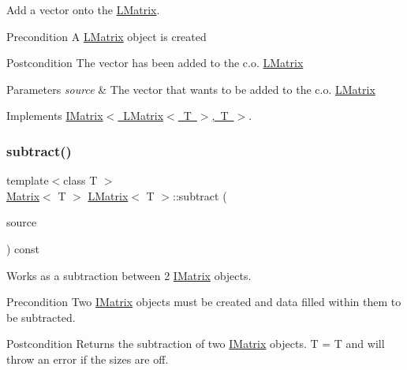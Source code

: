 Add a vector onto the \mbox{\hyperlink{class_l_matrix}{L\+Matrix}}. 

\begin{DoxyPrecond}{Precondition}
A \mbox{\hyperlink{class_l_matrix}{L\+Matrix}} object is created 
\end{DoxyPrecond}
\begin{DoxyPostcond}{Postcondition}
The vector has been added to the c.\+o. \mbox{\hyperlink{class_l_matrix}{L\+Matrix}}
\end{DoxyPostcond}

\begin{DoxyParams}{Parameters}
{\em source} & The vector that wants to be added to the c.\+o. \mbox{\hyperlink{class_l_matrix}{L\+Matrix}} \\
\hline
\end{DoxyParams}


Implements \mbox{\hyperlink{class_i_matrix_aa5de147c7aa5b74b0f2177ed1a8158de}{I\+Matrix$<$ L\+Matrix$<$ T $>$, T $>$}}.

\mbox{\label{class_l_matrix_a879cb328b94b4416855b1f15895b1691}} 
\subsubsection{\texorpdfstring{subtract()}{subtract()}\hspace{0.1cm}{\footnotesize\ttfamily [1/6]}}
{\footnotesize\ttfamily template$<$class T $>$ \\
\mbox{\hyperlink{class_matrix}{Matrix}}$<$ T $>$ \mbox{\hyperlink{class_l_matrix}{L\+Matrix}}$<$ T $>$\+::subtract (\begin{DoxyParamCaption}\item[{const \mbox{\hyperlink{class_i_matrix}{I\+Matrix}}$<$ \mbox{\hyperlink{class_matrix}{Matrix}}$<$ T $>$, T $>$ \&}]{source }\end{DoxyParamCaption}) const}



Works as a subtraction between 2 \mbox{\hyperlink{class_i_matrix}{I\+Matrix}} objects. 

\begin{DoxyPrecond}{Precondition}
Two \mbox{\hyperlink{class_i_matrix}{I\+Matrix}} objects must be created and data filled within them to be subtracted. 
\end{DoxyPrecond}
\begin{DoxyPostcond}{Postcondition}
Returns the subtraction of two \mbox{\hyperlink{class_i_matrix}{I\+Matrix}} objects. T = T and will throw an error if the sizes are off.
\end{DoxyPostcond}

